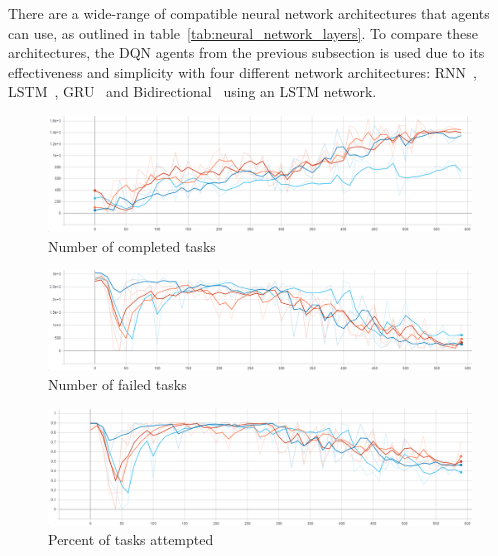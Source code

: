 There are a wide-range of compatible neural network architectures that agents can use, as outlined in
table~\ref{tab:neural_network_layers}. To compare these architectures, the DQN agents from the previous subsection is
used due to its effectiveness and simplicity with four different network architectures: RNN~\citep{RNN},
LSTM~\citep{LSTM}, GRU~\citep{GRU} and Bidirectional~\citep{Bidirectional} using an LSTM network. \\

\begin{figure}[H]
    \centering
    \includegraphics[width=\linewidth]{figures/4_test_eval_figs/net_arch_training_fig/num_completed_tasks.PNG}
    \caption{Number of completed tasks}
    \label{fig:net_arch_num_completed_tasks}
\end{figure}

\begin{figure}[H]
    \centering
    \includegraphics[width=\linewidth]{figures/4_test_eval_figs/net_arch_training_fig/num_failed_tasks.png}
    \caption{Number of failed tasks}
    \label{fig:net_arch_num_failed_tasks}
\end{figure}

\begin{figure}[H]
    \centering
    \includegraphics[width=\linewidth]{figures/4_test_eval_figs/net_arch_training_fig/percent_tasks.png}
    \caption{Percent of tasks attempted}
    \label{fig:net_arch_percent_tasks}
\end{figure}

